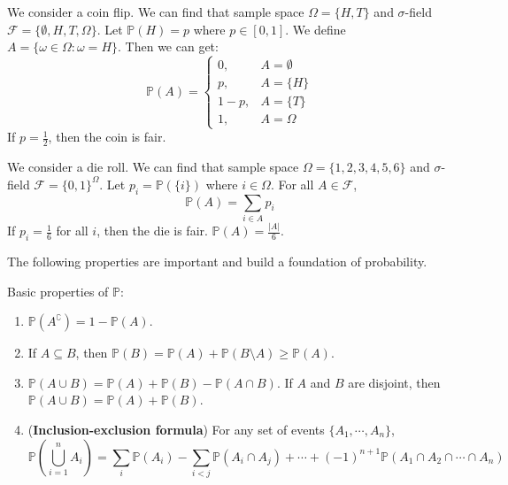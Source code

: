 \documentclass{huhtakm-template-book}
\newcommand{\prob}{\mathbb{P}}
\begin{document}
    \newpage
    \begin{eg}
        We consider a coin flip. We can find that sample space $\Omega=\{H,T\}$ and $\sigma$-field $\mathcal{F}=\{\emptyset,H,T,\Omega\}$. Let $\prob(H)=p$ where $p\in[0,1]$. We define $A=\{\omega\in\Omega:\omega = H\}$. Then we can get:
        \begin{equation*}
            \prob(A)=\begin{cases}
                0, &A=\emptyset\\
                p, &A=\{H\}\\
                1-p, &A=\{T\}\\
                1, &A=\Omega
            \end{cases}
        \end{equation*}
        If $p=\frac{1}{2}$, then the coin is fair.   
    \end{eg}
    \begin{eg}
        We consider a die roll. We can find that sample space $\Omega=\{1,2,3,4,5,6\}$ and $\sigma$-field $\mathcal{F}=\{0,1\}^{\Omega}$. Let $p_{i}=\prob(\{i\})$ where $i\in\Omega$. For all $A\in\mathcal{F}$,
        \begin{equation*}
            \prob(A)=\sum_{i\in A}p_{i}
        \end{equation*}
        If $p_{i}=\frac{1}{6}$ for all $i$, then the die is fair. $\prob(A)=\frac{|A|}{6}$.
    \end{eg}
    The following properties are important and build a foundation of probability.
    \begin{lem}
        Basic properties of $\prob$:
        \begin{enumerate}
            \item $\prob(A^{\complement})=1-\prob(A)$.
            \item If $A\subseteq B$, then $\prob(B)=\prob(A)+\prob(B\setminus A)\geq\prob(A)$.
            \item $\prob(A\cup B)=\prob(A)+\prob(B)-\prob(A\cap B)$. If $A$ and $B$ are disjoint, then $\prob(A\cup B)=\prob(A)+\prob(B)$.
		    \item (\textbf{Inclusion-exclusion formula}) For any set of events $\{A_{1},\cdots,A_{n}\}$,
            \begin{equation*}
                \prob\left(\bigcup_{i=1}^{n}A_{i}\right)=\sum_{i}\prob(A_{i})-\sum_{i<j}\prob(A_{i}\cap A_{j})+\cdots+(-1)^{n+1}\prob(A_{1}\cap A_{2}\cap\cdots\cap A_{n})
            \end{equation*}
        \end{enumerate}
    \end{lem}
\end{document}

